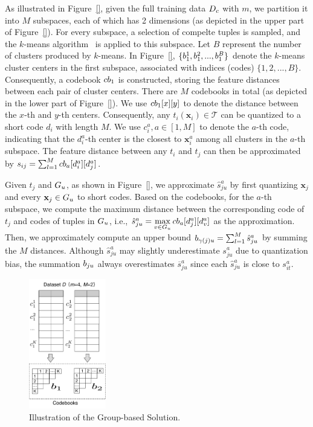 As illustrated in Figure~\ref{}, given the full training data $D_c$ with $m$, we partition it into $M$ subspaces, each of which has 2 dimensions (as depicted in the upper part of Figure~\ref{}). For every subspace, a selection of compelte tuples is sampled, and the $k$-means algorithm~\cite{} is applied to this subspace. Let $B$ represent the number of clusters produced by $k$-means. In Figure~\ref{}, $\{b_1^1, b_1^2,..., b_1^B\}$ denote the $k$-means cluster centers in the first subspace, associated with indices (codes) $\{1, 2,...,B\}$. Consequently, a codebook $cb_1$ is constructed, storing the feature distances between each pair of cluster centers. There are $M$ codebooks in total (as depicted in the lower part of Figure~\ref{}). We use $cb_1[x][y]$ to denote the distance between the $x$-th and $y$-th centers. Consequently, any $t_i (\mathbf{x}_i) \in \mathcal{T}$ can be quantized to a short code $d_i$ with length $M$. We use $c_i^a, a\in[1,M]$ to denote the $a$-th code, indicating that the $d_i^a$-th center is the closest to $\mathbf{x}_i^a$ among all clusters in the $a$-th subspace. The feature distance between any $t_i$ and $t_j$ can then be approximated by $s_{ij}=\sum_{l=1}^{M}cb_a[d_i^a][d_j^a]$.

Given $t_{j}$ and $G_u$, as shown in Figure~\ref{}, we approximate $\hat{s}_{ju}^a$ by first quantizing $\mathbf{x}_{j}$ and every $\mathbf{x}_{j} \in G_u$ to short codes. Based on the codebooks, for the $a$-th subspace, we compute the maximum distance between the corresponding code of $t_{j}$ and codes of tuples in $G_u$, i.e., $\hat{s}_{ju}^a = \max\limits_{v\in G_u}cb_a[d_{j}^a][d_v^a]$ as the approximation. Then, we approximately compute an upper bound $b_{\gamma(j)u}=\sum_{l=1}^{M}\hat{s}_{ju}^a$ by summing the $M$ distances. Although $\hat{s}_{ju}^a$ may slightly underestimate $s^a_{ju}$ due to quantization bias, the summation $b_{ju}$ always overestimates $\overline{s}^a_{ju}$ since each $\hat{s}_{ju}^a$ is close to $s^a_{it}$.

\begin{figure}[t]
    \centering
    \includegraphics[width=0.3\textwidth]{figs/codebook}
    \caption{Illustration of the Group-based Solution.}
    \label{fig:codebook}
\end{figure}

